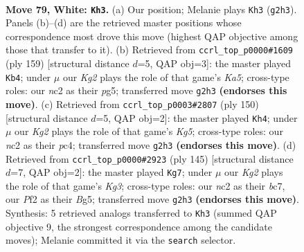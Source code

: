 \documentclass[11pt]{article}
\begin{document}
\clearpage

\begin{figure}[p]\centering
\begin{subfigure}{0.46\textwidth}\centering
\resizebox{\linewidth}{!}{%
\newchessgame
\chessboard[
  setfen={8/7k/b7/8/5B2/8/2n2PK1/8 w - - 3 79},
  showmover=false,
  pgfstyle=straightmove, color=movearrow, markmove={g2-h3}
]}
\caption{}
\end{subfigure}\hfill
\begin{subfigure}{0.46\textwidth}\centering
\resizebox{\linewidth}{!}{%
\newchessgame
\chessboard[
  setfen={8/8/6b1/3K2P1/k7/1p6/1B6/8 b - - 7 80},
  showmover=false,
  pgfstyle=straightmove, color=movearrow, markmove={a4-b4}
]}
\caption{}
\end{subfigure}
\\[4pt]
\begin{subfigure}{0.46\textwidth}\centering
\resizebox{\linewidth}{!}{%
\newchessgame
\chessboard[
  setfen={8/k7/7P/6K1/2p5/2B5/2b5/8 w - - 1 76},
  showmover=false,
  pgfstyle=straightmove, color=movearrow, markmove={g5-h4}
]}
\caption{}
\end{subfigure}\hfill
\begin{subfigure}{0.46\textwidth}\centering
\resizebox{\linewidth}{!}{%
\newchessgame
\chessboard[
  setfen={8/2B5/6k1/1K4b1/8/8/3p4/3B4 b - - 5 73},
  showmover=false,
  pgfstyle=straightmove, color=movearrow, markmove={g6-g7}
]}
\caption{}
\end{subfigure}
\caption{\textbf{Move 79, White: \texttt{Kh3}.} (a) Our position; Melanie plays \texttt{Kh3} (\texttt{g2h3}). Panels (b)--(d) are the retrieved master positions whose correspondence most drove this move (highest QAP objective among those that transfer to it). (b) Retrieved from \texttt{ccrl\_top\_p0000\#1609} (ply 159) [structural distance $d$=5, QAP obj=3]: the master played \texttt{Kb4}; under $\mu$ our \emph{Kg2} plays the role of that game's \emph{Ka5}; cross-type roles: our \emph{n}c2 as their \emph{p}g5; transferred move \texttt{g2h3} \textbf{(endorses this move)}. (c) Retrieved from \texttt{ccrl\_top\_p0003\#2807} (ply 150) [structural distance $d$=5, QAP obj=2]: the master played \texttt{Kh4}; under $\mu$ our \emph{Kg2} plays the role of that game's \emph{Kg5}; cross-type roles: our \emph{n}c2 as their \emph{p}c4; transferred move \texttt{g2h3} \textbf{(endorses this move)}. (d) Retrieved from \texttt{ccrl\_top\_p0000\#2923} (ply 145) [structural distance $d$=7, QAP obj=2]: the master played \texttt{Kg7}; under $\mu$ our \emph{Kg2} plays the role of that game's \emph{Kg3}; cross-type roles: our \emph{n}c2 as their \emph{b}c7, our \emph{P}f2 as their \emph{B}g5; transferred move \texttt{g2h3} \textbf{(endorses this move)}. Synthesis: 5 retrieved analogs transferred to \texttt{Kh3} (summed QAP objective 9, the strongest correspondence among the candidate moves); Melanie committed it via the \texttt{search} selector.}
\label{fig:thought-m156}
\end{figure}
\end{document}
